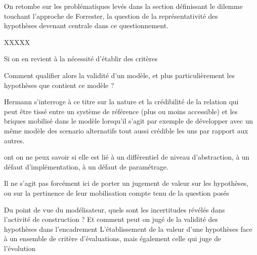 
On retombe sur les problématiques levés dans la section définissant le dilemme touchant l'approche de Forrester, la question de la représentativité des hypothèses devenant centrale dans ce questionnement.





XXXXX





Si on en revient à la nécessité d'établir des critères 




Comment qualifier alors la validité d'un modèle, et plus particulièrement les hypothèses que contient ce modèle ?

Hermann s'interroge à ce titre sur la nature et la crédibilité de la relation qui peut être tissé entre un système de référence (plus ou moins accessible) et les briques mobilisé dans le modèle lorsqu'il s'agit par exemple de développer avec un même modèle des scenario alternatifs tout aussi crédible les uns par rapport aux autres.



\autocite{Cottineau2014a}


ont on ne peux savoir si elle est lié à un différentiel de niveau d'abstraction, à un défaut d'implémentation, à un défaut de paramétrage.

Il ne s'agit pas forcément ici de porter un jugement de valeur sur les hypothèses, ou sur la pertinence de leur mobilisation compte tenu de la question posés


Du point de vue du modélisateur, quels sont les incertitudes révélés dans l'activité de construction ? Et comment peut on jugé de la validité des hypothèses dans l'encadrement L'établissement de la valeur d'une hypothèses face à un ensemble de critère d'évaluations, mais également celle qui juge de l'évolution


